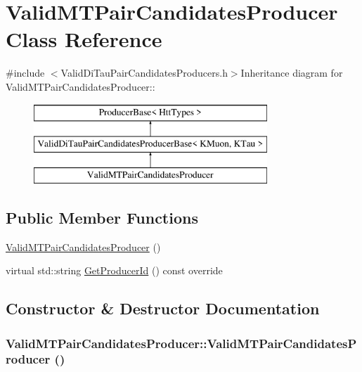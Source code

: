 \hypertarget{classValidMTPairCandidatesProducer}{
\section{ValidMTPairCandidatesProducer Class Reference}
\label{classValidMTPairCandidatesProducer}
}


{\ttfamily \#include $<$ValidDiTauPairCandidatesProducers.h$>$}Inheritance diagram for ValidMTPairCandidatesProducer::\begin{figure}[H]
\begin{center}
\leavevmode
\includegraphics[height=3cm]{classValidMTPairCandidatesProducer}
\end{center}
\end{figure}
\subsection*{Public Member Functions}
\begin{DoxyCompactItemize}
\item 
\hyperlink{classValidMTPairCandidatesProducer_a62d12b4b6a70d0d8bb992dfb894b215f}{ValidMTPairCandidatesProducer} ()
\item 
virtual std::string \hyperlink{classValidMTPairCandidatesProducer_ac644278c7d0b1cb740cae7eff383aa0a}{GetProducerId} () const override
\end{DoxyCompactItemize}


\subsection{Constructor \& Destructor Documentation}
\hypertarget{classValidMTPairCandidatesProducer_a62d12b4b6a70d0d8bb992dfb894b215f}{
\subsubsection[{ValidMTPairCandidatesProducer}]{\setlength{\rightskip}{0pt plus 5cm}ValidMTPairCandidatesProducer::ValidMTPairCandidatesProducer ()}}
\label{classValidMTPairCandidatesProducer_a62d12b4b6a70d0d8bb992dfb894b215f}



